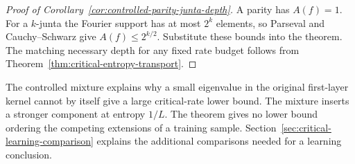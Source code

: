 \begin{proof}[Proof of Corollary~\ref{cor:controlled-parity-junta-depth}]
A parity has $A(f)=1$. For a $k$-junta the Fourier support has at most
$2^k$ elements, so Parseval and Cauchy--Schwarz give
$A(f)\le2^{k/2}$. Substitute these bounds into the theorem.
The matching necessary depth for any fixed rate budget follows from
Theorem~\ref{thm:critical-entropy-transport}.
\end{proof}

The controlled mixture explains why a small eigenvalue in the original
first-layer kernel cannot by itself give a large critical-rate lower
bound. The mixture inserts a stronger component at entropy $1/L$.
The theorem gives no lower bound ordering the competing extensions of
a training sample. Section~\ref{sec:critical-learning-comparison}
explains the additional comparisons needed for a learning conclusion.
